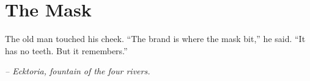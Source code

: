 \chapter*{The Mask}

The old man touched his cheek. ``The brand is where the mask bit,'' he said. ``It has no teeth. But it remembers.''

\smallskip

\noindent \textit{-- Ecktoria, fountain of the four rivers.}

